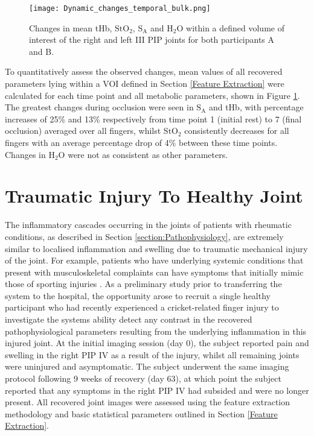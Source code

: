 \documentclass[twoside]{bhamthesis}
\theoremstyle{definition}
\begin{document}
\begin{figure}[!ht]
\centering\texttt{[image: Dynamic\_changes\_temporal\_bulk.png]}
\caption{Changes in mean tHb, $\mathrm{StO_2}$, $\mathrm{S_A}$ and
$\mathrm{H_2O}$ within a defined volume of interest of the right and left III PIP joints for both participants A and B.}
\label{Dynamic_changes_temporal_bulk}
\end{figure}

To quantitatively assess the observed changes, mean values of all recovered parameters lying within a VOI defined in Section \ref{Feature Extraction} were calculated for each time point and all metabolic parameters, shown in Figure \ref{Dynamic_changes_temporal_bulk}. The greatest changes during occlusion were seen in $\mathrm{S_A}$ and tHb, with percentage increases of 25\% and 13\% respectively from time point 1 (initial rest) to 7 (final occlusion) averaged over all fingers, whilst $\mathrm{StO_2}$ consistently decreases for all fingers with an average percentage drop of 4\% between these time points. Changes in $\mathrm{H_2O}$ were not as consistent as other parameters.

\section{Traumatic Injury To Healthy Joint}

The inflammatory cascades occurring in the joints of patients with rheumatic conditions, as described in Section 
\ref{section:Pathophysiology}, are extremely similar to localised inflammation and swelling due to traumatic mechanical injury of the joint. For example, patients who have underlying systemic conditions that present with musculoskeletal complaints can have symptoms that initially mimic those of sporting injuries \cite{jennings2008rheumatic}. As a preliminary study prior to transferring the system to the hospital, the opportunity arose to recruit a single healthy participant who had recently experienced a cricket-related finger injury to investigate the systems ability detect any contrast in the recovered pathophysiological parameters resulting from the underlying inflammation in this injured joint. At the initial imaging session (day 0), the subject reported pain and swelling in the right PIP IV as a result of the injury, whilst all remaining joints were uninjured and asymptomatic. The subject underwent the same imaging protocol following 9 weeks of recovery (day 63), at which point the subject reported that any symptoms in the right PIP IV had subsided and were no longer present. All recovered joint images were assessed using the feature extraction methodology and basic statistical parameters outlined in Section \ref{Feature Extraction}.
\end{document}
